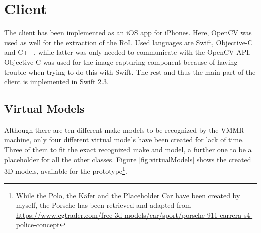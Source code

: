 \section{Client}\label{sec:clientImpl}
The client has been implemented as an iOS app for iPhones. Here, OpenCV was used as well for the extraction of the RoI. Used languages are Swift, Objective-C and C++, while latter was only needed to communicate with the OpenCV API. Objective-C was used for the image capturing component because of having trouble when trying to do this with Swift. The rest and thus the main part of the client is implemented in Swift 2.3.

\subsection{Virtual Models}
Although there are ten different make-models to be recognized by the VMMR machine, only four different virtual models have been created for lack of time. Three of them to fit the exact recognized make and model, a further one to be a placeholder for all the other classes. Figure \ref{fig:virtualModels} shows the created 3D models, available for the prototype\footnote{While the Polo, the K\"afer and the Placeholder Car have been created by myself, the Porsche has been retrieved and adapted from \url{https://www.cgtrader.com/free-3d-models/car/sport/porsche-911-carrera-s4-police-concept}}.

